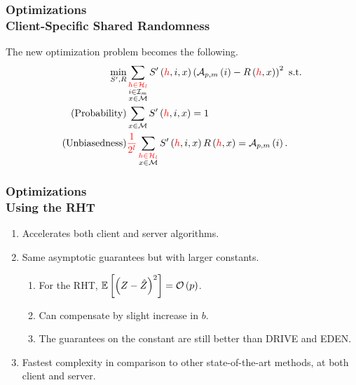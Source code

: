 \documentclass{beamer}
\begin{document}
    \begin{frame}
        \frametitle{Optimizations\\\small Client-Specific Shared Randomness}
        The new optimization problem becomes the following.
        \begin{align}
            \min_{S^\prime,R} &\sum_{\substack{\textcolor{red}{h\in\mathcal H_l}\\i\in\mathcal I_m\\x\in\mathcal M}}S^\prime\left(\textcolor{red}{h},i,x\right)\left(\mathcal A_{p,m}\left(i\right) - R\left(\textcolor{red}{h},x\right)\right)^2 \text{ s.t.} \\
            \text{(Probability)} &\sum_{x\in\mathcal M}S^\prime\left(\textcolor{red}{h},i,x\right) = 1 \\
            \text{(Unbiasedness)} &\textcolor{red}{\frac{1}{2^l}}\sum_{\substack{\textcolor{red}{h\in\mathcal H_l}\\x\in\mathcal M}}S^\prime\left(\textcolor{red}{h},i,x\right)R\left(\textcolor{red}{h},x\right) = \mathcal A_{p,m}\left(i\right).
            \label{eq:opt-quic-fl-rand}
        \end{align}
    \end{frame}

    \begin{frame}
        \frametitle{Optimizations\\\small Using the RHT}    
        \begin{enumerate}
            \item Accelerates both client and server algorithms.
            \item Same asymptotic guarantees but with larger constants. 
            \begin{enumerate}
                \item For the RHT, \(\mathbb{E}\left[ \left(Z-\hat{Z}\right)^2 \right] = \mathcal O\left(p\right)\).
                \item Can compensate by slight increase in \(b\).
                \item The guarantees on the constant are still better than DRIVE
                and EDEN.
            \end{enumerate}
            \item Fastest complexity in comparison to other state-of-the-art
            methods, at both client and server.
        \end{enumerate}
    \end{frame}
    
\end{document}
